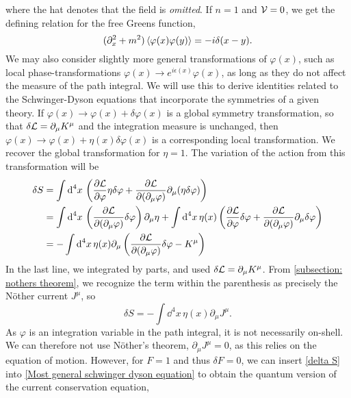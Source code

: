 %
where the hat denotes that the field is \emph{omitted}.
If $n = 1$ and $\mathcal{V} = 0$, we get the defining relation for the free Greens function,
%
\begin{equation}
    (\partial^2_x + m^2)\braket{\varphi(x)\varphi(y)}
    = -i \delta(x - y).
\end{equation}
%
We may also consider slightly more general transformations of $\varphi(x)$, such as local phase-transformations $\varphi(x) \rightarrow e^{i\epsilon(x)}\varphi(x)$, as long as they do not affect the measure of the path integral.
We will use this to derive identities related to the Schwinger-Dyson equations that incorporate the symmetries of a given theory.
If $\varphi(x) \rightarrow \varphi(x) + \delta \varphi(x)$ is a global symmetry transformation, so that $\delta \mathcal{L} = \partial_\mu K^\mu$ and the integration measure is unchanged, then $\varphi(x) \rightarrow \varphi(x) + \eta(x) \delta \varphi(x)$ is a corresponding local transformation.
We recover the global transformation for $\eta = 1$.
The variation of the action from this transformation will be
%
\begin{align}
    \nonumber
    \delta S 
    &= 
    \int \text{d}^4 x \,
    \left(
        \pdv{\mathcal{L}}{\varphi} \eta \delta \varphi
        + \pdv{\mathcal{L}}{(\partial_\mu\varphi) } \partial_\mu (\eta \delta \varphi)
    \right)\\
    \nonumber
    & =
    \int \text{d}^4 x \, \left( \pdv{\mathcal{L}}{(\partial_\mu \varphi)} \delta \varphi \right) \partial_\mu \eta
    + \int \text{d}^4 x \, \eta(x)
    \left( 
        \pdv{\mathcal{L}}{\varphi} \delta \varphi 
        + \pdv{\mathcal{L}}{(\partial_\mu \varphi)} \partial_\mu \delta \varphi  
    \right)\\
    \nonumber
    &=
    - \int \text{d}^4 x \, \eta(x) \partial_\mu 
    \left(  \pdv{\mathcal{L}}{(\partial_\mu \varphi)} \delta \varphi - K^\mu \right)
\end{align}
%
In the last line, we integrated by parts, and used $\delta \mathcal{L} = \partial_\mu K^\mu$.
From \autoref{subsection: nothers theorem}, we recognize the term within the parenthesis as precisely the Nöther current $J^\mu$, so
%
\begin{equation}
    \label{delta S}
    \delta S = - \int \dd^4 x \, \eta(x) \partial_\mu J^\mu.
\end{equation}
%
As $\varphi$ is an integration variable in the path integral, it is not necessarily on-shell.
We can therefore not use Nöther's theorem, $\partial_\mu J^\mu = 0$, as this relies on the equation of motion.
However, for $F = 1$ and thus $\delta F = 0$, we can insert \autoref{delta S} into \autoref{Most general schwinger dyson equation} to obtain the quantum version of the current conservation equation,
